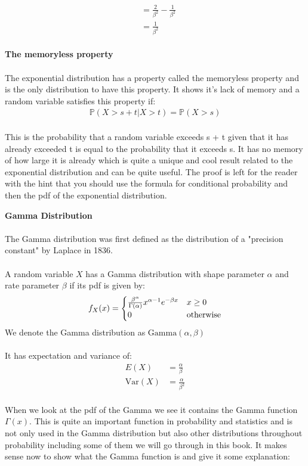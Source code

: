 \documentclass[,oneside]{article}
\begin{document}
\begin{enumerate}
\begin{enumerate}
\begin{align*}
&= \frac{2}{\beta^2}-\frac{1}{\beta^2}\\
&= \frac{1}{\beta^2}
\end{align*}\\
\textbf{The memoryless property}\\ \\
The exponential distribution has a property called the memoryless property and is the only distribution to have this property. It shows it's lack of memory and a random variable satisfies this property if:\\ 
\begin{align*}
\mathbb{P}(X > s + t | X > t) = \mathbb{P}(X > s)
\end{align*}\\
This is the probability that a random variable exceeds s + t given that it has already exceeded t is equal to the probability that it exceeds s. It has no memory of how large it is already which is quite a unique and cool result related to the exponential distribution and can be quite useful. The proof is left for the reader with the hint that you should use the formula for conditional probability and then the pdf of the exponential distribution.\\
\end{enumerate}
\textbf{Gamma Distribution}\\ \\
The Gamma distribution was first defined as the distribution of a "precision constant" by Laplace in 1836. \\ \\
A random variable $X$ has a Gamma distribution with shape parameter $\alpha$ and rate parameter $\beta$ if its pdf is given by:\\
\[
f_X(x)=
\begin{cases}
\frac{\beta^{\alpha}}{\Gamma{(\alpha)}} x^{\alpha-1}e^{-\beta x} &  x \geq 0\\
0 & $otherwise$
\end{cases} \] 
We denote the Gamma distribution as $\text{Gamma}(\alpha,\beta)$\\ \\
It has expectation and variance of:
\begin{align*}
E(X)&=\frac{\alpha}{\beta}\\
\text{Var}(X)&=\frac{\alpha}{\beta^2}
\end{align*}\\
When we look at the pdf of the Gamma we see it contains the Gamma function $\Gamma(x)$. This is quite an important function in probability and statistics and is not only used in the Gamma distribution but also other distributions throughout probability including some of them we will go through in this book. It makes sense now to show what the Gamma function is and give it some explanation:\\ \\ \\ \\

\end{enumerate}
\end{document}
